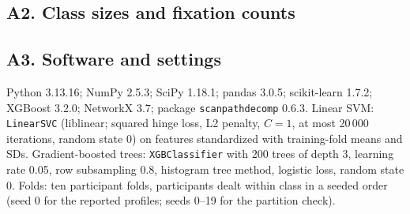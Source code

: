 \documentclass[10pt]{article}
\begin{document}
\subsection*{A2. Class sizes and fixation counts}
\begin{table}[H]\centering\scriptsize
\caption{Trials and participants per class, and fixations per trial, for every problem (after the exclusions of Section 4 of the article). Class labels are those of the released loaders.}

\end{table}

\subsection*{A3. Software and settings}
Python 3.13.16; NumPy 2.5.3; SciPy 1.18.1; pandas 3.0.5; scikit-learn 1.7.2; XGBoost 3.2.0; NetworkX 3.7; package \texttt{scanpathdecomp} 0.6.3. Linear SVM: \texttt{LinearSVC} (liblinear; squared hinge loss, L2 penalty, $C = 1$, at most 20\,000 iterations, random state 0) on features standardized with training-fold means and SDs. Gradient-boosted trees: \texttt{XGBClassifier} with 200 trees of depth 3, learning rate 0.05, row subsampling 0.8, histogram tree method, logistic loss, random state 0. Folds: ten participant folds, participants dealt within class in a seeded order (seed 0 for the reported profiles; seeds 0--19 for the partition check).


\end{document}
